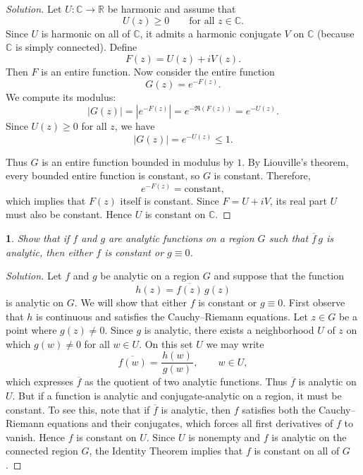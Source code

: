 \documentclass[12pt, a4paper]{report}
\theoremstyle{spaced}
\newtheorem{exercise}{}
\newcommand{\setexercise}[1]{\setcounter{exercise}{#1-1}}
\begin{document}
\begin{proof}[Solution]
	Let $U:\mathbb{C}\to\mathbb{R}$ be harmonic and assume that
	\[
		U(z)\ge 0 \qquad \text{for all } z\in\mathbb{C}.
	\]
	Since $U$ is harmonic on all of $\mathbb{C}$, it admits a harmonic conjugate $V$ on $\mathbb{C}$ (because $\mathbb{C}$ is simply connected).
	Define
	\[
		F(z)=U(z)+iV(z).
	\]
	Then $F$ is an entire function.
	Now consider the entire function
	\[
		G(z)=e^{-F(z)}.
	\]
	We compute its modulus:
	\[
		|G(z)| = |e^{-F(z)}|
		= e^{-\Re(F(z))}
		= e^{-U(z)}.
	\]
	Since $U(z)\ge 0$ for all $z$, we have
	\[
		|G(z)| = e^{-U(z)} \le 1.
	\]

	Thus \(G\) is an entire function bounded in modulus by \(1\).
	By Liouville’s theorem, every bounded entire function is constant, so \(G\) is constant. Therefore,
	\[
		e^{-F(z)} = \text{constant},
	\]
	which implies that \(F(z)\) itself is constant.
	Since \(F = U + iV\), its real part \(U\) must also be constant.
	Hence \(U\) is constant on \(\mathbb{C}\).
\end{proof}

\setexercise{10}
\begin{exercise}
	Show that if $f$ and $g$ are analytic functions on a region $G$ such that $\overline{f}\, g$ is analytic,
	then either $f$ is constant or $g \equiv 0$.
\end{exercise}

\begin{proof}[Solution]
	Let $f$ and $g$ be analytic on a region $G$ and suppose that the function
	\[
		h(z)=\overline{f(z)}\, g(z)
	\]
	is analytic on $G$.
	We will show that either $f$ is constant or $g \equiv 0$.
	First observe that $h$ is continuous and satisfies the Cauchy--Riemann equations.
	Let $z\in G$ be a point where $g(z)\neq 0$.
	Since $g$ is analytic, there exists a neighborhood $U$ of $z$ on which $g(w)\neq 0$ for all $w\in U$.
	On this set $U$ we may write
	\[
		\overline{f(w)} = \frac{h(w)}{\,g(w)\,}, \qquad w\in U,
	\]
	which expresses $\overline{f}$ as the quotient of two analytic functions.
	Thus $\overline{f}$ is analytic on $U$.
	But if a function is analytic and conjugate-analytic on a region, it must be constant.
	To see this, note that if $\overline{f}$ is analytic, then $f$ satisfies both the Cauchy--Riemann equations and their conjugates, which forces all first derivatives of $f$ to vanish.
	Hence $f$ is constant on $U$.
	Since $U$ is nonempty and $f$ is analytic on the connected region $G$, the Identity Theorem implies that $f$ is constant on all of $G$.
\end{proof}
\end{document}
